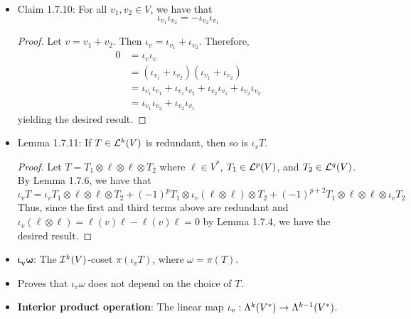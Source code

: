\documentclass[../notes.tex]{subfiles}
\begin{document}
\begin{itemize}
\begin{proof}
        \begin{equation*}
            \iota_v(\iota_v(T\otimes\ell)) = \iota_v(\iota_vT)\otimes\ell+(-1)^{k-2}\ell(v)\iota_vT+(-1)^{k-1}\ell(v)\iota_vT
        \end{equation*}
        The first term is zero by the inductive hypothesis, and the second two cancel each other out, as desired.
    \end{proof}
    \item Claim 1.7.10: For all $v_1,v_2\in V$, we have that
    \begin{equation*}
        \iota_{v_1}\iota_{v_2} = -\iota_{v_2}\iota_{v_1}
    \end{equation*}
    \begin{proof}
        Let $v=v_1+v_2$. Then $\iota_v=\iota_{v_1}+\iota_{v_2}$. Therefore,
        \begin{align*}
            0 &= \iota_v\iota_v\tag*{Lemma 1.7.8}\\
            &= (\iota_{v_1}+\iota_{v_2})(\iota_{v_1}+\iota_{v_2})\\
            &= \iota_{v_1}\iota_{v_1}+\iota_{v_1}\iota_{v_2}+\iota_{v_2}\iota_{v_1}+\iota_{v_2}\iota_{v_2}\\
            &= \iota_{v_1}\iota_{v_2}+\iota_{v_2}\iota_{v_1}\tag*{Lemma 1.7.8}
        \end{align*}
        yielding the desired result.
    \end{proof}
    \item Lemma 1.7.11: If $T\in\lin[k]{V}$ is redundant, then so is $\iota_vT$.
    \begin{proof}
        Let $T=T_1\otimes\ell\otimes\ell\otimes T_2$ where $\ell\in V^*$, $T_1\in\lin[p]{V}$, and $T_2\in\lin[q]{V}$. By Lemma 1.7.6, we have that
        \begin{equation*}
            \iota_vT = \iota_vT_1\otimes\ell\otimes\ell\otimes T_2+(-1)^pT_1\otimes\iota_v(\ell\otimes\ell)\otimes T_2+(-1)^{p+2}T_1\otimes\ell\otimes\ell\otimes\iota_vT_2
        \end{equation*}
        Thus, since the first and third terms above are redundant and $\iota_v(\ell\otimes\ell)=\ell(v)\ell-\ell(v)\ell=0$ by Lemma 1.7.4, we have the desired result.
    \end{proof}
    \item $\bm{\iota_v\omega}$: The $\ide[k]{V}$-coset $\pi(\iota_vT)$, where $\omega=\pi(T)$.
    \item Proves that $\iota_v\omega$ does not depend on the choice of $T$.
    \item \textbf{Interior product operation}: The linear map $\iota_v:\lam[k]{V^*}\to\lam[k-1]{V^*}$.

\end{itemize}
\end{document}
